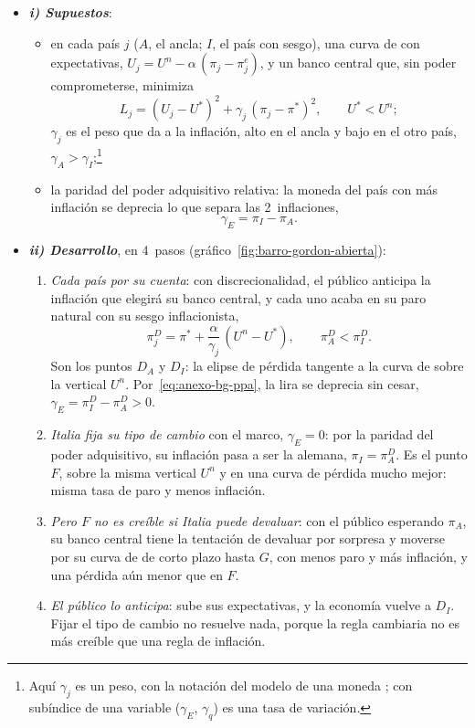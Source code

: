 \documentclass[11pt]{article}
\begin{document}
\begin{itemize}
\item \textbf{\emph{i) Supuestos}}:
  \begin{itemize}
  \item en cada país $j$ ($A$, el ancla; $I$, el país con sesgo), una curva de  con expectativas, $U_j=U^n-\alpha\,(\pi_j-\pi_j^e)$, y un banco central que, sin poder comprometerse, minimiza
    \begin{equation}\label{eq:anexo-bg-perdida}
    L_j=(U_j-U^*)^2+\gamma_j\,(\pi_j-\pi^*)^2,\qquad U^*<U^n;
    \end{equation}
    $\gamma_j$ es el peso que da a la inflación, alto en el ancla y bajo en el otro país, $\gamma_A>\gamma_I$;\footnote{Aquí $\gamma_j$ es un peso, con la notación del modelo de una moneda ; con subíndice de una variable ($\gamma_E$, $\gamma_q$) es una tasa de variación.}
  \item la paridad del poder adquisitivo relativa: la moneda del país con más inflación se deprecia lo que separa las 2~inflaciones,
    \begin{equation}\label{eq:anexo-bg-ppa}
    \gamma_E=\pi_I-\pi_A .
    \end{equation}
  \end{itemize}
\item \textbf{\emph{ii) Desarrollo}}, en 4~pasos (gráfico~\ref{fig:barro-gordon-abierta}):
  \begin{enumerate}
  \item \emph{Cada país por su cuenta}: con discrecionalidad, el público anticipa la inflación que elegirá su banco central, y cada uno acaba en su paro natural con su sesgo inflacionista,
    \begin{equation}\label{eq:anexo-bg-sesgo}
    \pi^D_j=\pi^*+\frac{\alpha}{\gamma_j}\,(U^n-U^*),\qquad \pi^D_A<\pi^D_I .
    \end{equation}
    Son los puntos $D_A$ y $D_I$: la elipse de pérdida tangente a la curva de  sobre la vertical $U^n$. Por~\eqref{eq:anexo-bg-ppa}, la lira se deprecia sin cesar, $\gamma_E=\pi^D_I-\pi^D_A>0$.
  \item \emph{Italia fija su tipo de cambio} con el marco, $\gamma_E=0$: por la paridad del poder adquisitivo, su inflación pasa a ser la alemana, $\pi_I=\pi^D_A$. Es el punto $F$, sobre la misma vertical $U^n$ y en una curva de pérdida mucho mejor: misma tasa de paro y menos inflación.
  \item \emph{Pero $F$ no es creíble si Italia puede devaluar}: con el público esperando $\pi_A$, su banco central tiene la tentación de devaluar por sorpresa y moverse por su curva de  de corto plazo hasta $G$, con menos paro y más inflación, y una pérdida aún menor que en $F$.
  \item \emph{El público lo anticipa}: sube sus expectativas, y la economía vuelve a $D_I$. Fijar el tipo de cambio no resuelve nada, porque la regla cambiaria no es más creíble que una regla de inflación\nocite{DeGrauwe2022Economics}.
  \end{enumerate}
\end{itemize}
\end{document}
